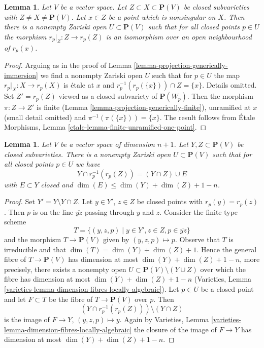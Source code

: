 \documentclass{stacks-project}
\theoremstyle{plain}
\newtheorem{lemma}[subsection]{Lemma}
\theoremstyle{definition}
\theoremstyle{remark}
\numberwithin{equation}{subsection}
\begin{document}
\begin{lemma}
\label{lemma-projection-generically-immersion-refined}
Let $V$ be a vector space. Let $Z \subset X \subset \mathbf{P}(V)$ be closed
subvarieties with $Z \not = X \not = \mathbf{P}(V)$. Let $x \in Z$ be a point
which is nonsingular on $X$. Then there is a nonempty Zariski open
$U \subset \mathbf{P}(V)$ such that for all closed points $p \in U$ the
morphism $r_p|_Z : Z \to r_p(Z)$ is an isomorphism over an open neighbourhood
of $r_p(x)$.
\end{lemma}

\begin{proof}
Arguing as in the proof of Lemma \ref{lemma-projection-generically-immersion}
we find a nonempty Zariski open $U$ such that for $p \in U$ the map
$r_p|_X : X \to r_p(X)$ is \'etale at $x$ and
$r_p^{-1}(r_p(\{x\})) \cap Z = \{x\}$. Details omitted.
Set $Z' = r_p(Z)$ viewed as a closed subvariety of $\mathbf{P}(W_p)$.
Then the morphism $\pi : Z \to Z'$ is finite
(Lemma \ref{lemma-projection-generically-finite}), unramified at $x$
(small detail omitted) and $\pi^{-1}(\pi(\{x\})) = \{x\}$. The result follows
from \'Etale Morphisms, Lemma \ref{etale-lemma-finite-unramified-one-point}.
\end{proof}

\begin{lemma}
\label{lemma-projection-injective}
Let $V$ be a vector space of dimension $n + 1$.
Let $Y, Z \subset \mathbf{P}(V)$ be closed subvarieties.
There is a nonempty Zariski open $U \subset \mathbf{P}(V)$
such that for all closed points $p \in U$ we have
$$
Y \cap r_p^{-1}(r_p(Z)) = (Y \cap Z) \cup E
$$
with $E \subset Y$ closed and
$\dim(E) \leq \dim(Y) + \dim(Z) + 1 - n$.
\end{lemma}

\begin{proof}
Set $Y' = Y \setminus Y \cap Z$.
Let $y \in Y'$, $z \in Z$ be closed points with $r_p(y) = r_p(z)$.
Then $p$ is on the line $\overline{yz}$ passing through $y$ and $z$.
Consider the finite type scheme
$$
T = \{(y, z, p) \mid y \in Y', z \in Z, p \in \overline{yz}\}
$$
and the morphism $T \to \mathbf{P}(V)$ given by $(y, z, p) \mapsto p$.
Observe that $T$ is irreducible and that $\dim(T) = \dim(Y) + \dim(Z) + 1$.
Hence the general fibre of $T \to \mathbf{P}(V)$ has dimension at most
$\dim(Y) + \dim(Z) + 1 - n$, more precisely, there exists a nonempty
open $U \subset \mathbf{P}(V) \setminus (Y \cup Z)$ over
which the fibre has dimension at most $\dim(Y) + \dim(Z) + 1 - n$
(Varieties, Lemma \ref{varieties-lemma-dimension-fibres-locally-algebraic}).
Let $p \in U$ be a closed point and let $F \subset T$ be the fibre
of $T \to \mathbf{P}(V)$ over $p$. Then
$$
(Y \cap r_p^{-1}(r_p(Z))) \setminus (Y \cap Z)
$$
is the image of $F \to Y$, $(y, z, p) \mapsto y$. Again by
Varieties, Lemma \ref{varieties-lemma-dimension-fibres-locally-algebraic}
the closure of the image of $F \to Y$ has dimension at most
$\dim(Y) + \dim(Z) + 1 - n$.
\end{proof}
\end{document}
